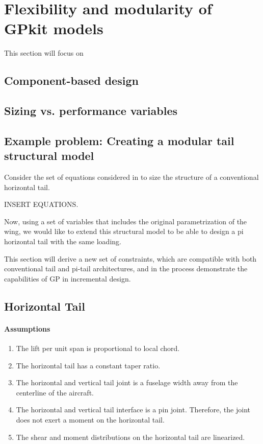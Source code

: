 \chapter{Flexibility and modularity of GPkit models}

This section will focus on

\section{Component-based design}

\section{Sizing vs. performance variables}

\section{Example problem: Creating a modular tail structural model}

Consider the set of equations considered in \cite{SP_ac_design} to size
the structure of a conventional horizontal tail. 

INSERT EQUATIONS. 

Now, using a set of variables that includes the original parametrization of the wing, 
we would like to extend this structural model to be able to design a pi horizontal tail
with the same loading. 

This section will derive a new set of constraints, which are compatible with 
both conventional tail and pi-tail architectures, and in the process demonstrate the 
capabilities of \gls{GP} in incremental design. 

\section{Horizontal Tail }

\subsubsection{Assumptions}
\begin{enumerate}
    \item The lift per unit span is proportional to local chord.
    \item The horizontal tail has a constant taper ratio.
    \item The horizontal and vertical tail joint is a fuselage width away from 
the centerline of the aircraft. 
    \item The horizontal and vertical tail interface is a pin joint. Therefore, 
the joint does not exert a moment on the horizontal tail. 
    \label{item:pinjoint}
    \item The shear and moment distributions on the horizontal tail are 
linearized. 
\end{enumerate}

